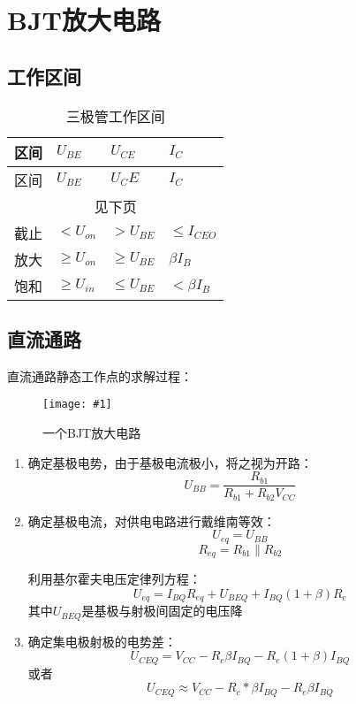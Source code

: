\documentclass[cn,11pt,chinese,black,simple]{../elegantbook}
\newcommand{\qfig}[2]{\begin{figure}[!htb]
    \centering
    \texttt{[image: \#1]}
    \caption{#2}
  \end{figure}}
\begin{document}
\fi 

\chapter{BJT放大电路}

\section{工作区间}

\begin{longtable}{llll}
    \caption{三极管工作区间} \\
    \toprule 区间 & \(U_{BE}\) & \(U_{CE}\) & \(I_C\) \\
    \midrule
    \endfirsthead
    
    \toprule 区间 & \(U_{BE}\) & \(U_CE\) & \(I_C\) \\
    \midrule
    \endhead

    \hline
    \multicolumn{4}{c}{见下页}\\   
    \bottomrule
    \endfoot

    \bottomrule
    \endlastfoot

    截止 & \(< U_{on}\) & \(> U_{BE}\) & \(\leq I_{CEO}\)  \\
    放大 & \(\geq U_{on}\) & \(\geq U_{BE}\) & \(\beta I_{B}\) \\
    饱和 & \(\geq U_{in}\) & \(\leq U_{BE}\) & \(< \beta I_B\)
    
\end{longtable}

\section{直流通路}

直流通路静态工作点的求解过程：

\qfig{f1.png}{一个BJT放大电路}

\begin{solution}
    \begin{enumerate}
        \item 确定基极电势，由于基极电流极小，将之视为开路： \[U_{BB} = \frac{R_{b1}}{R_{b1}+R_{b2} V_{CC}}\]
        \item 确定基极电流，对供电电路进行戴维南等效：\[U_{eq} = U_{BB}\] \[R_{eq} = R_{b1} \| R_{b2}\]
        
        利用基尔霍夫电压定律列方程： \[U_{eq} = I_{BQ}  R_{eq} + U_{BEQ} + I_{BQ}  (1 + \beta)  R_e\]
        其中\(U_{BEQ}\)是基极与射极间固定的电压降
        \item 确定集电极射极的电势差：\[U_{CEQ} = V_{CC} - R_c  \beta I_{BQ} - R_e  (1 + \beta) I_{BQ}\]
        或者 \[U_{CEQ} \approx V_{CC} - R_c * \beta I_{BQ} - R_e   \beta I_{BQ}\] 
    \end{enumerate}
\end{solution}
\end{document}
